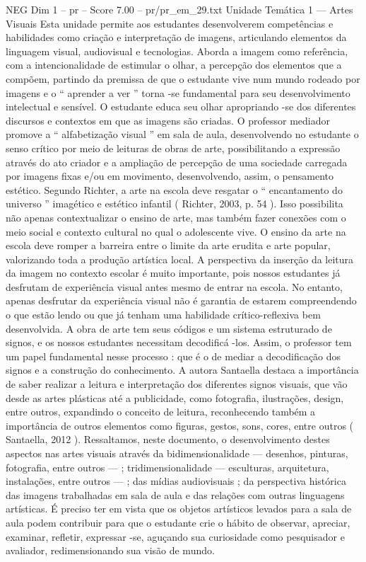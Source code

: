 \begin{textsample}{NEG Dim 1 – pr – Score 7.00 – pr/pr\_em\_29.txt}  \label{ex:f1_neg_268}
Unidade Temática 1 — Artes Visuais Esta unidade permite aos estudantes desenvolverem competências e habilidades como criação e interpretação de imagens, articulando elementos da linguagem visual, audiovisual e tecnologias.
Aborda a imagem como referência, com a intencionalidade de estimular o olhar, a percepção dos elementos que a compõem, partindo da premissa de que o estudante vive num mundo rodeado por imagens e o “ aprender a ver ” torna -se fundamental para seu desenvolvimento intelectual e sensível.
O estudante educa seu olhar apropriando -se dos diferentes discursos e contextos em que as imagens são criadas.
O professor mediador promove a “ alfabetização visual ” em sala de aula, desenvolvendo no estudante o senso crítico por meio de leituras de obras de arte, possibilitando a expressão através do ato criador e a ampliação de percepção de uma sociedade carregada por imagens fixas e/ou em movimento, desenvolvendo, assim, o pensamento estético.
Segundo Richter, a arte na escola deve resgatar o “ encantamento do universo ” imagético e estético infantil ( Richter, 2003, p. 54 ).
Isso possibilita não apenas contextualizar o ensino de arte, mas também fazer conexões com o meio social e contexto cultural no qual o adolescente vive.
O ensino da arte na escola deve romper a barreira entre o limite da arte erudita e arte popular, valorizando toda a produção artística local.
A perspectiva da inserção da leitura da imagem no contexto escolar é muito importante, pois nossos estudantes já desfrutam de experiência visual antes mesmo de entrar na escola.
No entanto, apenas desfrutar da experiência visual não é garantia de estarem compreendendo o que estão lendo ou que já tenham uma habilidade crítico-reflexiva bem desenvolvida.
A obra de arte tem seus códigos e um sistema estruturado de signos, e os nossos estudantes necessitam decodificá -los.
Assim, o professor tem um papel fundamental nesse processo : que é o de mediar a decodificação dos signos e a construção do conhecimento.
A autora Santaella destaca a importância de saber realizar a leitura e interpretação dos diferentes signos visuais, que vão desde as artes plásticas até a publicidade, como fotografia, ilustrações, design, entre outros, expandindo o conceito de leitura, reconhecendo também a importância de outros elementos como figuras, gestos, sons, cores, entre outros ( Santaella, 2012 ).
Ressaltamos, neste documento, o desenvolvimento destes aspectos nas artes visuais através da bidimensionalidade — desenhos, pinturas, fotografia, entre outros — ; tridimensionalidade — esculturas, arquitetura, instalações, entre outros — ; das mídias audiovisuais ; da perspectiva histórica das imagens trabalhadas em sala de aula e das relações com outras linguagens artísticas.
É preciso ter em vista que os objetos artísticos levados para a sala de aula podem contribuir para que o estudante crie o hábito de observar, apreciar, examinar, refletir, expressar -se, aguçando sua curiosidade como pesquisador e avaliador, redimensionando sua visão de mundo.

\end{textsample}
